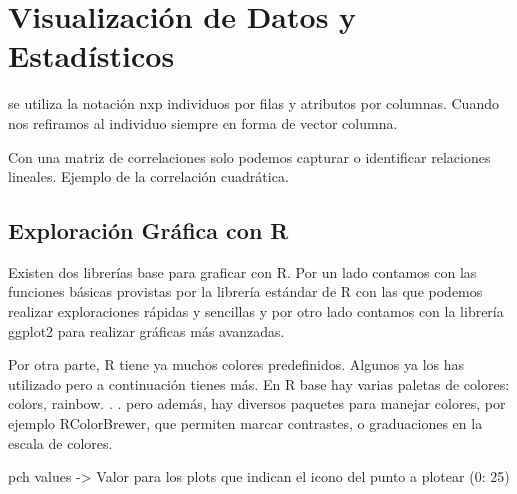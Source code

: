 
\newcommand{\estudiante}{García Justel, Alan}
\newcommand{\titulo}{MÁSTER EN INGENIERÍA COMPUTACIONAL Y SISTEMAS INTELIGENTES}
\newcommand{\asignatura}{EXPLORACIÓN Y ANÁLISIS DE DATOS}
\newcommand{\portada}{common/no_signal.png}
\newcommand{\colorportada}{title_green}
\newcommand{\curso}{2024-2025}



\newpage

\section{Visualización de Datos y Estadísticos}
se utiliza la notación nxp individuos por filas y atributos por columnas. Cuando nos refiramos al individuo siempre en forma de vector columna.



Con una matriz de correlaciones solo podemos capturar o identificar relaciones lineales. Ejemplo de la correlación cuadrática.


\subsection{Exploración Gráfica con R}
Existen dos librerías base para graficar con R. Por un lado contamos con las funciones básicas provistas por la librería estándar de R con las que podemos realizar exploraciones rápidas y sencillas y por otro lado contamos con la librería ggplot2 para realizar gráficas más avanzadas.

Por otra parte, R tiene ya muchos colores predefinidos. Algunos ya los has utilizado pero a continuación tienes más. En R base hay varias paletas de colores: colors, rainbow. . . pero además, hay diversos paquetes para manejar colores, por ejemplo RColorBrewer, que permiten marcar contrastes, o graduaciones en la escala de colores.


pch values -> Valor para los plots que indican el icono del punto a plotear (0: 25)

